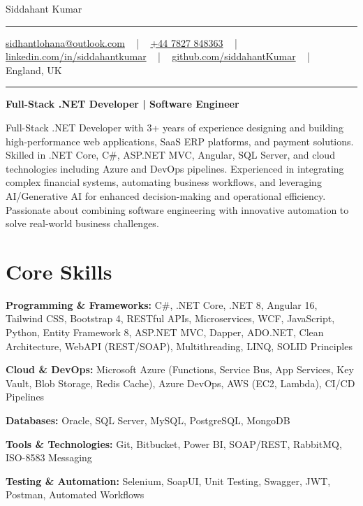 \documentclass[letterpaper,10pt]{article}
\newcommand{\documentTitle}[2]{
  \begin{center}
    \vspace*{-0.3in}
    {\Huge\color{accentTitle} #1}
    \vspace{8pt}
    {\color{accentLine} \hrule}
    \vspace{2pt}
    \footnotesize{#2}
    \vspace{2pt}
    {\color{accentLine} \hrule}
  \end{center}
}
\newenvironment{resume_list}{
  \vspace{-7pt}
  \begin{itemize}[itemsep=-2px, parsep=1pt, leftmargin=30pt]
}{
  \end{itemize}
}
\begin{document}
\documentTitle{Siddahant Kumar}{
\vspace{0.1cm}
\href{mailto:sidhantlohana@outlook.com}{sidhantlohana@outlook.com} ~ | ~
\href{tel:+447827848363}{+44 7827 848363} ~ | ~
\href{https://www.linkedin.com/in/siddahantkumar/}{linkedin.com/in/siddahantkumar} ~ | ~
\href{https://github.com/siddahantKumar}{github.com/siddahantKumar} ~ | ~
England, UK
}

\begin{center}
\textbf{Full-Stack .NET Developer | Software Engineer}
\end{center}

Full-Stack .NET Developer with 3+ years of experience designing and building high-performance web applications, SaaS ERP platforms, and payment solutions. Skilled in .NET Core, C\#, ASP.NET MVC, Angular, SQL Server, and cloud technologies including Azure and DevOps pipelines. Experienced in integrating complex financial systems, automating business workflows, and leveraging AI/Generative AI for enhanced decision-making and operational efficiency. Passionate about combining software engineering with innovative automation to solve real-world business challenges.


\section{Core Skills}

\begin{resume_list}
    \item \textbf{Programming \& Frameworks:} C\#, .NET Core, .NET 8, Angular 16, Tailwind CSS, Bootstrap 4, RESTful APIs, Microservices, WCF, JavaScript, Python, Entity Framework 8, ASP.NET MVC, Dapper, ADO.NET, Clean Architecture, WebAPI (REST/SOAP), Multithreading, LINQ, SOLID Principles
    \item \textbf{Cloud \& DevOps:} Microsoft Azure (Functions, Service Bus, App Services, Key Vault, Blob Storage, Redis Cache), Azure DevOps, AWS (EC2, Lambda), CI/CD Pipelines
    \item \textbf{Databases:} Oracle, SQL Server, MySQL, PostgreSQL, MongoDB
    \item \textbf{Tools \& Technologies:} Git, Bitbucket, Power BI, SOAP/REST, RabbitMQ, ISO-8583 Messaging
    \item \textbf{Testing \& Automation:} Selenium, SoapUI, Unit Testing, Swagger, JWT, Postman, Automated Workflows
\end{resume_list}
\end{document}
